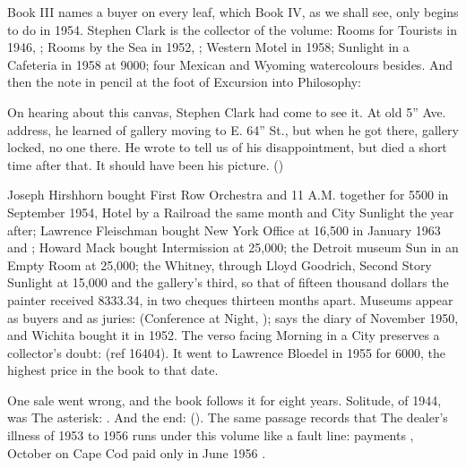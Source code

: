 Book III names a buyer on every leaf, which Book IV, as we shall see, only begins to do in 1954. Stephen Clark is the collector of the volume: Rooms for Tourists in 1946, ; Rooms by the Sea in 1952, ; Western Motel in 1958; Sunlight in a Cafeteria in 1958 at 9000; four Mexican and Wyoming watercolours besides. And then the note in pencil at the foot of Excursion into Philosophy:

\begin{leafquote}
On hearing about this canvas, Stephen Clark had come to see it. At old 5'' Ave. address, he learned of gallery moving to E. 64'' St., but when he got there, gallery locked, no one there. He wrote to tell us of his disappointment, but died a short time after that. It should have been his picture. \hfill ()
\end{leafquote}

\noindent Joseph Hirshhorn bought First Row Orchestra and 11 A.M. together for 5500 in September 1954, Hotel by a Railroad the same month and City Sunlight the year after; Lawrence Fleischman bought New York Office at 16,500 in January 1963 and ; Howard Mack bought Intermission at 25,000; the Detroit museum Sun in an Empty Room at 25,000; the Whitney, through Lloyd Goodrich, Second Story Sunlight at 15,000  and the gallery's third, so that of fifteen thousand dollars the painter received 8333.34, in two cheques thirteen months apart. Museums appear as buyers and as juries:  (Conference at Night, );  says the diary of November 1950, and Wichita bought it in 1952. The verso facing Morning in a City preserves a collector's doubt:  (ref 16404). It went to Lawrence Bloedel in 1955 for 6000, the highest price in the book to that date.

One sale went wrong, and the book follows it for eight years. Solitude, of 1944, was  The asterisk: . And the end:  (). The same passage records that  The dealer's illness of 1953 to 1956 runs under this volume like a fault line: payments , October on Cape Cod paid only in June 1956 .

